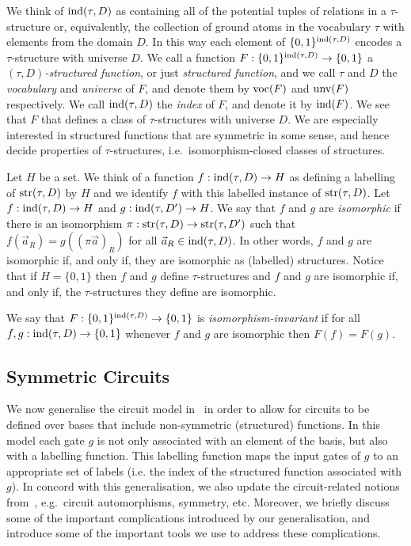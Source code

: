 \documentclass[a4paper,UKenglish]{lipics-v2018}
\begin{document}
We think of $\text{\upshape ind}(\tau, D)$ as containing all of the potential tuples of
relations in a $\tau$-structure or, equivalently, the collection of ground atoms
in the vocabulary $\tau$ with elements from the domain $D$. In this way each
element of $\{0,1\}^{\text{\upshape ind}(\tau, D)}$ encodes a $\tau$-structure with universe
$D$. We call a function $F : \{0,1\}^{\text{\upshape ind}(\tau, D)} \rightarrow \{0,1\}$ a
\emph{$(\tau, D)$-structured function}, or just \emph{structured function}, and
we call $\tau$ and $D$ the \emph{vocabulary} and \emph{universe} of $F$, and
denote them by $\text{voc}(F)$ and $\text{unv}(F)$ respectively. We call $\text{\upshape ind}(\tau,
D)$ the \emph{index} of $F$, and denote it by $\text{\upshape ind}(F)$. We see that $F$ that
defines a class of $\tau$-structures with universe $D$. We are especially
interested in structured functions that are symmetric in some sense, and hence
decide properties of $\tau$-structures, i.e.\ isomorphism-closed classes of
structures.

Let $H$ be a set. We think of a function $f : \text{\upshape ind}(\tau, D) \rightarrow H$ as
defining a labelling of $\text{str}(\tau,D)$ by $H$ and we identify $f$ with this
labelled instance of $\text{str}(\tau, D)$. Let $f: \text{\upshape ind}(\tau, D) \rightarrow H$ and $g : \text{\upshape ind}
(\tau, D') \rightarrow H$. We say that $f$ and $g$ are \emph{isomorphic} if there is an
isomorphism $\pi : \text{str}(\tau, D) \rightarrow \text{str}(\tau, D')$ such that $f(\vec{a}_R) =
g((\pi\vec{a})_R)$ for all $\vec{a}_R \in \text{\upshape ind}(\tau, D)$. In other words, $f$
and $g$ are isomorphic if, and only if, they are isomorphic as (labelled)
structures. Notice that if $H = \{0,1\}$ then $f$ and $g$ define
$\tau$-structures and $f$ and $g$ are isomorphic if, and only if, the
$\tau$-structures they define are isomorphic.

We say that $F : \{0,1\}^{\text{\upshape ind}(\tau,D)} \rightarrow \{0,1\}$ is
\emph{isomorphism-invariant} if for all $f, g : \text{\upshape ind}(\tau, D) \rightarrow \{0,1\}$
whenever $f$ and $g$ are isomorphic then $F(f) = F(g)$.

\subsection{Symmetric Circuits}
We now generalise the circuit model in~\cite{AndersonD17} in order to allow for
circuits to be defined over bases that include non-symmetric (structured)
functions. In this model each gate $g$ is not only associated with an element of
the basis, but also with a labelling function. This labelling function maps the
input gates of $g$ to an appropriate set of labels (i.e. the index of the
structured function associated with $g$). In concord with this generalisation,
we also update the circuit-related notions from~\cite{AndersonD17}, e.g.\
circuit automorphisms, symmetry, etc. Moreover, we briefly discuss some of the
important complications introduced by our generalisation, and introduce some of
the important tools we use to address these complications.
\end{document}
